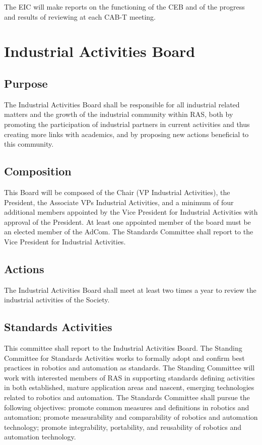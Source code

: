 \documentclass[10pt]{article}
\begin{document}
The EIC will make reports on the functioning of the CEB and of the progress and results of reviewing at each CAB-T meeting.


\section{Industrial Activities Board}
\label{IAB}
\subsection{Purpose}

The Industrial Activities Board shall be responsible for all industrial related matters and the growth of the industrial community within RAS, both by promoting the participation of industrial partners in current activities and thus creating more links with academics, and by proposing new actions beneficial to this community.

\subsection{Composition}
This Board will be composed of the Chair (VP Industrial Activities), the President, the Associate VPs Industrial Activities, and a minimum of four additional members appointed by the Vice President for Industrial Activities with approval of the President. At least one appointed member of the board must be an elected member of the AdCom. The Standards Committee shall report to the Vice President for Industrial Activities.

\subsection{Actions}
The Industrial Activities Board shall meet at least two times a year to review the industrial activities of the Society.

\subsection{Standards Activities}
This committee shall report to the Industrial Activities Board. The Standing Committee for Standards Activities works to formally adopt and confirm best practices in robotics and automation as standards. The Standing Committee will work with interested members of RAS in supporting standards defining activities in both established, mature application areas and nascent, emerging technologies related to robotics and automation. The Standards Committee shall pursue the following objectives: promote common measures and definitions in robotics and automation; promote measurability and comparability of robotics and automation technology; promote integrability, portability, and reusability of robotics and automation technology.
\end{document}
